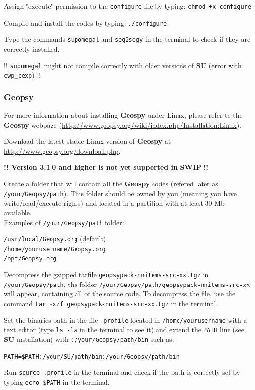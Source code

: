 \documentclass[twoside,a4paper]{article}
\def\SU{\textbf{SU}}
\def\Geopsy{\textbf{Geospy}}
\begin{document}
Assign "execute" permission to the \verb|configure| file by typing: \verb|chmod +x configure|

Compile and install the codes by typing: \verb|./configure|

Type the commands \verb|supomegal| and \verb|seg2segy| in the terminal to check if they are correctly installed.

!! \verb|supomegal| might not compile correctly with older versions of {\SU} (error with \verb|cwp_cexp|) !!

\subsubsection{Geopsy}
For more information about installing {\Geopsy} under Linux, please refer to the {\Geopsy} webpage (\url{http://www.geopsy.org/wiki/index.php/Installation:Linux}).

Download the latest stable Linux version of {\Geopsy} at \url{http://www.geopsy.org/download.php}.

\textbf{!! Version 3.1.0 and higher is not yet supported in SWIP !!}

Create a folder that will contain all the {\Geopsy} codes (refered later as \verb|/your/Geopsy/path|). This folder should be owned by you (meaning you have write/read/execute rights) and located in a partition with at least 30 Mb available.\\[1ex]
Examples of \verb|/your/Geopsy/path| folder:

\verb|/usr/local/Geopsy.org| (default)\\
\verb|/home/yourusername/Geopsy.org|\\
\verb|/opt/Geopsy.org|

Decompress the gzipped tarfile \verb|geopsypack-nnitems-src-xx.tgz| in \verb|/your/Geopsy/path|, the folder \verb|/your/Geopsy/path/geopsypack-nnitems-src-xx| will appear, containing all of the source code. To decompress the file, use the command \verb|tar -xzf geopsypack-nnitems-src-xx.tgz| in the terminal.

Set the binaries path in the file \verb|.profile| located in \verb|/home/yourusername| with a text editor (type \verb|ls -la| in the terminal to see it) and extend the \verb|PATH| line (see {\SU} installation) with \verb|:/your/Geopsy/path/bin| such as:

\verb|PATH=$PATH:/your/SU/path/bin:/your/Geopsy/path/bin|

Run \verb|source .profile| in the terminal and check if the path is correctly set by typing \verb|echo $PATH| in the terminal.
\end{document}
